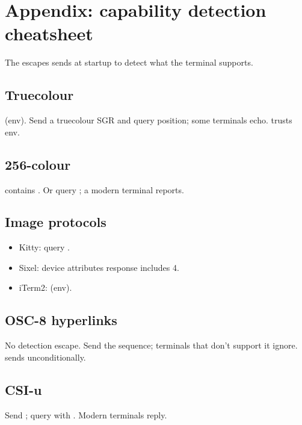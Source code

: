 \chapter{Appendix: capability detection cheatsheet}
\label{ch:capref}

\begin{aside}
The escapes \maya{} sends at startup to detect what the
terminal supports.
\end{aside}

\section{Truecolour}

 (env). Send a truecolour SGR and
query position; some terminals echo. \maya{} trusts env.

\section{256-colour}

 contains . Or query
\code{ESC [ ? 1 c}; a modern terminal reports.

\section{Image protocols}

\begin{itemize}[leftmargin=*]
  \item Kitty: query .
  \item Sixel: device attributes \code{ESC [ c} response
    includes 4.
  \item iTerm2:  (env).
\end{itemize}

\section{OSC-8 hyperlinks}

No detection escape. Send the sequence; terminals that
don't support it ignore. \maya{} sends unconditionally.

\section{CSI-u}

Send \code{ESC [ > 1 u}; query with \code{ESC [ ? u}.
Modern terminals reply.

